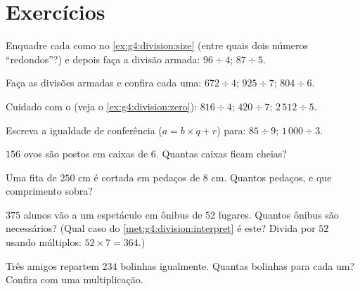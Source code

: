 \section{Exercícios}

\begin{exercise}[$\star$]\label{exo:g4:division:1}
Enquadre cada  como no \cref{ex:g4:division:size} (entre
quais dois números ``redondos''?) e depois faça a divisão armada:
$96 \div 4$; \quad $87 \div 5$.
\end{exercise}

\begin{exercise}[$\star$]\label{exo:g4:division:2}
Faça as divisões armadas e confira cada uma:
$672 \div 4$; \quad $925 \div 7$; \quad $804 \div 6$.
\end{exercise}

\begin{exercise}[$\star$]\label{exo:g4:division:3}
Cuidado com o  (veja o \cref{ex:g4:division:zero}):
$816 \div 4$; \quad $420 \div 7$; \quad $2\,512 \div 5$.
\end{exercise}

\begin{exercise}[$\star$]\label{exo:g4:division:4}
Escreva a igualdade de conferência ($a = b \times q + r$) para:
$85 \div 9$; \quad $1\,000 \div 3$.
\end{exercise}

\begin{exercise}[$\star$]\label{exo:g4:division:5}
$156$ ovos são postos em caixas de $6$. Quantas caixas ficam cheias?
\end{exercise}

\begin{exercise}[$\star$]\label{exo:g4:division:6}
Uma fita de $250$ cm é cortada em pedaços de $8$ cm. Quantos
pedaços, e que comprimento sobra?
\end{exercise}

\begin{exercise}[$\star$]\label{exo:g4:division:7}
$375$ alunos vão a um espetáculo em ônibus de $52$ lugares. Quantos
ônibus são necessários? (Qual caso do
\cref{met:g4:division:interpret} é este? Divida por $52$ usando
múltiplos: $52 \times 7 = 364$.)
\end{exercise}

\begin{exercise}[$\star$]\label{exo:g4:division:8}
Três amigos repartem $234$ bolinhas igualmente. Quantas bolinhas para
cada um? Confira com uma multiplicação.
\end{exercise}

